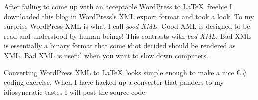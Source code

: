 After failing to come up with an acceptable WordPress to \LaTeX\
freebie I downloaded this blog in WordPress's XML export format and took
a look. To my surprise WordPress XML is what I call \emph{good XML.} Good
XML is designed to be read and understood by human beings! This
contrasts with \emph{bad XML.} Bad XML is essentially a binary format
that some idiot decided should be rendered as XML. Bad XML is useful
when you want to slow down computers.

Converting WordPress XML to \LaTeX\ looks simple enough to make a
nice C\# coding exercise. When I have hacked up a converter that panders
to my idiosyncratic tastes I will post the source code.



%